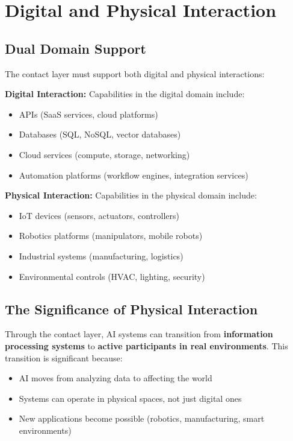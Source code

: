 \section{Digital and Physical Interaction}

\subsection{Dual Domain Support}

The contact layer must support both digital and physical interactions:

\textbf{Digital Interaction:} Capabilities in the digital domain include:
\begin{itemize}[leftmargin=*]
\item APIs (SaaS services, cloud platforms)
\item Databases (SQL, NoSQL, vector databases)
\item Cloud services (compute, storage, networking)
\item Automation platforms (workflow engines, integration services)
\end{itemize}

\textbf{Physical Interaction:} Capabilities in the physical domain include:
\begin{itemize}[leftmargin=*]
\item IoT devices (sensors, actuators, controllers)
\item Robotics platforms (manipulators, mobile robots)
\item Industrial systems (manufacturing, logistics)
\item Environmental controls (HVAC, lighting, security)
\end{itemize}

\subsection{The Significance of Physical Interaction}

Through the contact layer, AI systems can transition from \textbf{information processing systems} to \textbf{active participants in real environments}. This transition is significant because:
\begin{itemize}[leftmargin=*]
\item AI moves from analyzing data to affecting the world
\item Systems can operate in physical spaces, not just digital ones
\item New applications become possible (robotics, manufacturing, smart environments)
\end{itemize}

